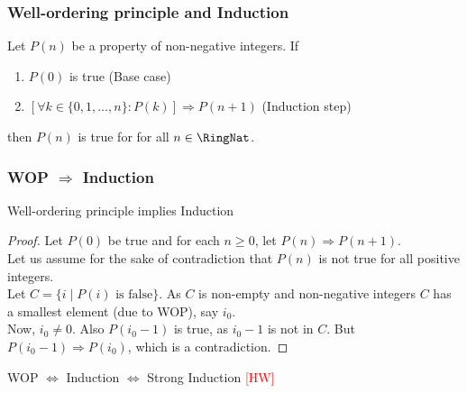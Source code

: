  \begin{frame}[fragile]
\frametitle{Well-ordering principle and Induction}
\begin{axiom}
Let $P(n)$ be a property of non-negative integers. If 
\begin{enumerate}
\item $P(0)$ is true (Base case)
\item $[\forall k \in \{0,1, \ldots, n\}: P(k)] \Rightarrow P(n+1)$ (Induction step)
\end{enumerate}
then $P(n)$ is true for for all $n \in \RingNat$.
\end{axiom}
\end{frame}

 \begin{frame}[fragile]
\frametitle{WOP $\Rightarrow$ Induction}
\begin{theorem}
Well-ordering principle implies Induction
\end{theorem}
\begin{proof}
Let $P(0)$ be true and for each $n \geq 0$, let $P(n) \Rightarrow P(n+1)$. \\
Let us assume for the sake of contradiction that $P(n)$ is not true for all positive integers. \\
Let $C = \{i \mid P(i) \mbox{ is false}\}$. As $C$ is non-empty and non-negative integers $C$ has a smallest element (due to WOP), say $i_0$.\\
Now, $i_0\neq 0$. Also $P(i_0-1)$ is true, as $i_0-1$ is not in $C$. But $P(i_0-1) \Rightarrow P(i_0)$, which is a contradiction.
\end{proof}

\begin{theorem}
WOP $\Leftrightarrow$ Induction $\Leftrightarrow$ Strong Induction \textcolor{red}{[HW]}
\end{theorem}

\end{frame}


